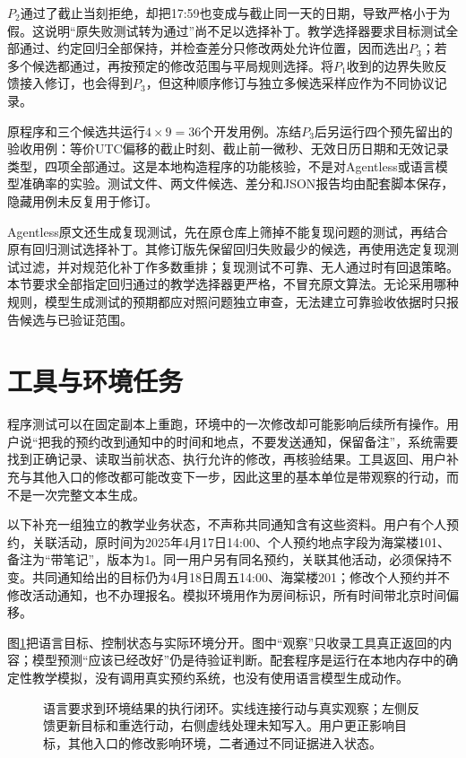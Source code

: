 $P_2$通过了截止当刻拒绝，却把17:59也变成与截止同一天的日期，导致严格小于为假。这说明“原失败测试转为通过”尚不足以选择补丁。教学选择器要求目标测试全部通过、约定回归全部保持，并检查差分只修改两处允许位置，因而选出$P_3$；若多个候选都通过，再按预定的修改范围与平局规则选择。将$P_1$收到的边界失败反馈接入修订，也会得到$P_3$，但这种顺序修订与独立多候选采样应作为不同协议记录。

原程序和三个候选共运行$4\times9=36$个开发用例。冻结$P_3$后另运行四个预先留出的验收用例：等价UTC偏移的截止时刻、截止前一微秒、无效日历日期和无效记录类型，四项全部通过。这是本地构造程序的功能核验，不是对Agentless或语言模型准确率的实验。测试文件、两文件候选、差分和JSON报告均由配套脚本保存，隐藏用例未反复用于修订。

Agentless原文还生成复现测试，先在原仓库上筛掉不能复现问题的测试，再结合原有回归测试选择补丁。其修订版先保留回归失败最少的候选，再使用选定复现测试过滤，并对规范化补丁作多数重排；复现测试不可靠、无人通过时有回退策略。本节要求全部指定回归通过的教学选择器更严格，不冒充原文算法。无论采用哪种规则，模型生成测试的预期都应对照问题独立审查，无法建立可靠验收依据时只报告候选与已验证范围。

\section{工具与环境任务}
\label{sec:nlp-execution-environment}

程序测试可以在固定副本上重跑，环境中的一次修改却可能影响后续所有操作。用户说“把我的预约改到通知中的时间和地点，不要发送通知，保留备注”，系统需要找到正确记录、读取当前状态、执行允许的修改，再核验结果。工具返回、用户补充与其他入口的修改都可能改变下一步，因此这里的基本单位是带观察的行动，而不是一次完整文本生成。

以下补充一组独立的教学业务状态，不声称共同通知含有这些资料。用户有个人预约，关联活动，原时间为2025年4月17日14:00、个人预约地点字段为海棠楼101、备注为“带笔记”，版本为1。同一用户另有同名预约，关联其他活动，必须保持不变。共同通知给出的目标仍为4月18日周五14:00、海棠楼201；修改个人预约并不修改活动通知，也不办理报名。模拟环境用作为房间标识，所有时间带北京时间偏移。

图\ref{fig:nlp-execution-environment-loop}把语言目标、控制状态与实际环境分开。图中“观察”只收录工具真正返回的内容；模型预测“应该已经改好”仍是待验证判断。配套程序是运行在本地内存中的确定性教学模拟，没有调用真实预约系统，也没有使用语言模型生成动作。

\begin{figure}[htbp]
  \centering
  
  \caption{语言要求到环境结果的执行闭环。实线连接行动与真实观察；左侧反馈更新目标和重选行动，右侧虚线处理未知写入。用户更正影响目标，其他入口的修改影响环境，二者通过不同证据进入状态。}
  \label{fig:nlp-execution-environment-loop}
\end{figure}
\FloatBarrier

